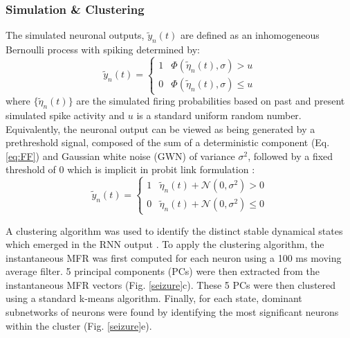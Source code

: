 \documentclass[11pt,a4paper,final]{article}
\begin{document}
\subsubsection{Simulation \& Clustering}
The simulated neuronal outputs, $\tilde{y}_n(t)$ are defined as an inhomogeneous Bernoulli process with spiking determined by:
\begin{equation}
\tilde{y}_n(t) =
\begin{cases}
1   & \Phi(\tilde{\eta}_n(t),\sigma) > u        \\
0   & \Phi(\tilde{\eta}_n(t),\sigma) \leq u
\end{cases}
\label{eq:simul}
\end{equation}
where $\{\tilde{\eta}_n(t)\}$ are the simulated firing probabilities based on past and present simulated spike activity and $u$ is a standard uniform random number.
Equivalently, the neuronal output can be viewed as being generated by a prethreshold signal, composed of the sum of a deterministic component (Eq. \ref{eq:FF}) and Gaussian white noise (GWN) of variance $\sigma^2$, followed by a fixed threshold of 0 which is implicit in probit link formulation \citep{berger12}:
\begin{equation}
\tilde{y}_n(t) =
\begin{cases}
1   & \tilde{\eta}_n(t) + \mathcal{N}(0,\sigma^2) > 0        \\
0   & \tilde{\eta}_n(t) + \mathcal{N}(0,\sigma^2) \leq 0
\end{cases}
\label{eq:simul2}
\end{equation}

A clustering algorithm was used to identify the distinct stable dynamical states which emerged in the RNN output \citep{sasaki07,santaniello14}.
To apply the clustering algorithm, the instantaneous MFR was first computed for each neuron using a 100 ms moving average filter.
5 principal components (PCs) were then extracted from the \nn{} instantaneous MFR vectors (Fig. \ref{seizure}c).
These 5 PCs were then clustered using a standard k-means algorithm.
Finally, for each state, dominant subnetworks of neurons were found by identifying the most significant neurons within the cluster (Fig. \ref{seizure}e).
\end{document}
